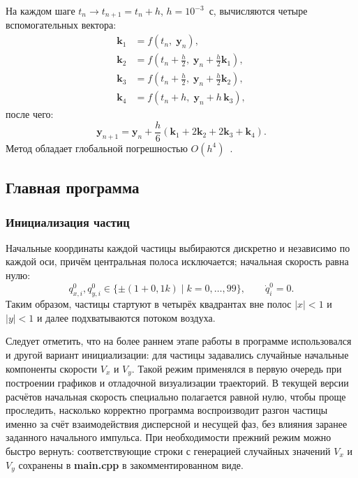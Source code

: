 \documentclass[14pt,a4paper]{extarticle}
\numberwithin{figure}{section}
\numberwithin{table}{section}
\begin{document}
На каждом шаге $t_n \to t_{n+1} = t_n + h$, $h = 10^{-3}$~с, вычисляются
четыре вспомогательных вектора:
\begin{align}
    \mathbf{k}_1 &= f(t_n,\; \mathbf{y}_n), \\
    \mathbf{k}_2 &= f\!\left(t_n + \tfrac{h}{2},\; \mathbf{y}_n + \tfrac{h}{2}\mathbf{k}_1\right), \\
    \mathbf{k}_3 &= f\!\left(t_n + \tfrac{h}{2},\; \mathbf{y}_n + \tfrac{h}{2}\mathbf{k}_2\right), \\
    \mathbf{k}_4 &= f(t_n + h,\; \mathbf{y}_n + h\,\mathbf{k}_3),
\end{align}
после чего:
\begin{equation}
    \mathbf{y}_{n+1} = \mathbf{y}_n + \frac{h}{6}\!\left(\mathbf{k}_1 + 2\mathbf{k}_2 + 2\mathbf{k}_3 + \mathbf{k}_4\right).
\end{equation}
Метод обладает глобальной погрешностью $O(h^4)$~\cite{HairerRK}.

\subsection{Главная программа}

\subsubsection{Инициализация частиц}

Начальные координаты каждой частицы выбираются дискретно и независимо по каждой оси,
причём центральная полоса исключается; начальная скорость равна нулю:
\begin{equation}
    q_{x,i}^0, q_{y,i}^0 \in \{\pm(1 + 0{,}1k)\mid k=0,\dots,99\},
    \qquad \dot{q}_i^0 = 0.
\end{equation}
Таким образом, частицы стартуют в четырёх квадрантах вне полос $|x|<1$ и $|y|<1$
и далее подхватываются потоком воздуха.

Следует отметить, что на более раннем этапе работы в программе использовался и другой
вариант инициализации: для частицы задавались случайные начальные компоненты скорости
$V_x$ и $V_y$. Такой режим применялся в первую очередь при построении графиков и
отладочной визуализации траекторий. В текущей версии расчётов начальная скорость
специально полагается равной нулю, чтобы проще проследить, насколько корректно программа
воспроизводит разгон частицы именно за счёт взаимодействия дисперсной и несущей фаз,
без влияния заранее заданного начального импульса. При необходимости прежний режим можно
быстро вернуть: соответствующие строки с генерацией случайных значений $V_x$ и $V_y$
сохранены в \textbf{main.cpp} в закомментированном виде.
\end{document}
